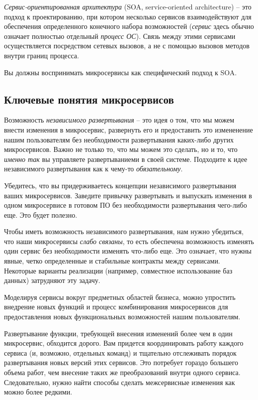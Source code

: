 \documentclass[%
	11pt,
	a4paper,
	utf8,
		]{article}
\begin{document}
\emph{Сервис-ориентированная архитектура} (SOA, service-oriented architecture) -- это подход к проектированию, при котором несколько сервисов взаимодействуют для обеспечения определенного конечного набора возможностей (\emph{сервис} здесь обычно означает полностью отдельный \emph{процесс ОС}). Связь между этими сервисами осуществляется посредством сетевых вызовов, а не с помощью вызовов методов внутри границ процесса.

Вы должны воспринимать микросервисы как специфический подход к SOA.

\subsection{Ключевые понятия микросервисов}

Возможность \emph{независимого развертывания} -- это идея о том, что мы можем внести изменения в микросервис, развернуть его и предоставить это измененение нашим пользователям без необходимости развертывания каких-либо других микросервисов. Важно не только то, что мы можем это сделать, но и то, что \emph{именно так} вы управляете развертываниеми в своей системе. Подходите к идее независимого развертывания как к чему-то \emph{обязательному}.

Убедитесь, что вы придерживаетесь концепции независимого развертывания ваших микросервисов. Заведите привычку развертывать и выпускать изменения в одном микросервисе в готовом ПО без необходимости развертывания чего-либо еще. Это будет полезно.

Чтобы иметь возможность независимого развертывания, нам нужно убедиться, что наши микросервисы \emph{слабо связаны}, то есть обеспечена возможность изменять один сервис без необходимости изменять что-либо еще. Это означает, что нужны явные, четко определенные и стабильные контракты между сервисами. Некоторые варианты реализации (например, совместное использование баз данных) затрудняют эту задачу.

Моделируя сервисы вокруг предметных областей бизнеса, можно упростить внедрение новых функций и процесс комбинирования микросервисов для предоставления новых функциональных возможностей нашим пользователям.

Развертывание функции, требующей внесения изменений более чем в один микросервис, обходится дорого. Вам придется координировать работу каждого сервиса (и, возможно, отдельных команд) и тщательно отслеживать порядок развертывания новых версий этих сервисов. Это потребует гораздо большего объема работ, чем внесение таких же преобразований внутри одного сервиса. Следовательно, нужно найти способы сделать межсервисные изменения как можно более редкими.
\end{document}
